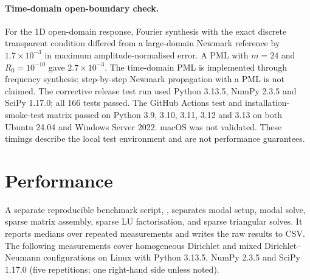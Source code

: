 \documentclass[preprint,12pt,a4paper]{elsarticle}
\begin{document}
\paragraph{Time-domain open-boundary check.}
For the 1D open-domain response, Fourier synthesis with the exact discrete transparent condition differed from a large-domain Newmark reference by $1.7\times10^{-3}$ in maximum amplitude-normalised error. A PML with $m=24$ and $R_0=10^{-10}$ gave $2.7\times10^{-3}$. The time-domain PML is implemented through frequency synthesis; step-by-step Newmark propagation with a PML is not claimed.
The corrective release test run used Python 3.13.5, NumPy 2.3.5 and SciPy 1.17.0; all 166 tests passed. The GitHub Actions test and installation-smoke-test matrix passed on Python 3.9, 3.10, 3.11, 3.12 and 3.13 on both Ubuntu 24.04 and Windows Server 2022. macOS was not validated. These timings describe the local test environment and are not performance guarantees.

\section{Performance}
A separate reproducible benchmark script, , separates modal setup, modal solve, sparse matrix assembly, sparse LU factorisation, and sparse triangular solves. It reports medians over repeated measurements and writes the raw results to CSV. The following measurements cover homogeneous Dirichlet and mixed Dirichlet--Neumann configurations on Linux with Python 3.13.5, NumPy 2.3.5 and SciPy 1.17.0 (five repetitions; one right-hand side unless noted).

\begin{table}[t]
\centering\small
{}
\caption{Five-repeat benchmark. Sparse assembly times were 0.98, 0.66, 1.28 and 1.42 ms in row order; four right-hand sides took 0.131, 0.153, 0.123 and 0.185 ms. Relative differences from the sparse direct solutions were $5.8\times10^{-15}$, $4.2\times10^{-14}$, $1.3\times10^{-15}$ and $7.2\times10^{-15}$.}
\label{tab:bench}
\end{table}
\end{document}
